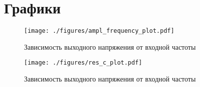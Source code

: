 \section{Графики}

\begin{figure}[H]
  \centering
  \texttt{[image: ./figures/ampl\_frequency\_plot.pdf]}
  \caption{Зависимость выходного напряжения от входной частоты}
  \label{fig:u_f}
\end{figure}

\begin{figure}[H]
  \centering
  \texttt{[image: ./figures/res\_c\_plot.pdf]}
  \caption{Зависимость выходного напряжения от входной частоты}
  \label{fig:res_c}
\end{figure}
